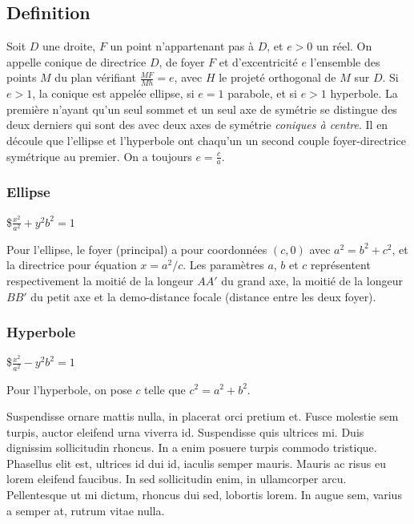 \hypertarget{definition}{%
\subsection{Definition}\label{definition}}

Soit \(D\) une droite, \(F\) un point n'appartenant pas à \(D\), et
\(e>0\) un réel. On appelle conique de directrice \(D\), de foyer \(F\)
et d'excentricité \(e\) l'ensemble des points \(M\) du plan vérifiant
\(\frac{MF}{Mh}=e\), avec \(H\) le projeté orthogonal de \(M\) sur
\(D\). Si \(e>1\), la conique est appelée ellipse, si \(e=1\) parabole,
et si \(e>1\) hyperbole. La première n'ayant qu'un seul sommet et un
seul axe de symétrie se distingue des deux derniers qui sont des avec
deux axes de symétrie \emph{coniques à centre}. Il en découle que
l'ellipse et l'hyperbole ont chaqu'un un second couple foyer-directrice
symétrique au premier. On a toujours \(e=\frac{c}{a}\).

\hypertarget{ellipse}{%
\subsubsection{Ellipse}\label{ellipse}}

\$\(\frac{x^2}{a^2}+{y^2}{b^2}=1\)

Pour l'ellipse, le foyer (principal) a pour coordonnées \((c,0)\) avec
\(a^2=b^2+c^2\), et la directrice pour équation \(x=a^2/c\). Les
paramètres \(a\), \(b\) et \(c\) représentent respectivement la moitié
de la longeur \(AA'\) du grand axe, la moitié de la longeur \(BB'\) du
petit axe et la demo-distance focale (distance entre les deux foyer).

\hypertarget{hyperbole}{%
\subsubsection{Hyperbole}\label{hyperbole}}

\$\(\frac{x^2}{a^2}-{y^2}{b^2}=1\)

Pour l'hyperbole, on pose \(c\) telle que \(c^2=a^2+b^2\).

Suspendisse ornare mattis nulla, in placerat orci pretium et. Fusce
molestie sem turpis, auctor eleifend urna viverra id. Suspendisse quis
ultrices mi. Duis dignissim sollicitudin rhoncus. In a enim posuere
turpis commodo tristique. Phasellus elit est, ultrices id dui id,
iaculis semper mauris. Mauris ac risus eu lorem eleifend faucibus. In
sed sollicitudin enim, in ullamcorper arcu. Pellentesque ut mi dictum,
rhoncus dui sed, lobortis lorem. In augue sem, varius a semper at,
rutrum vitae nulla.
